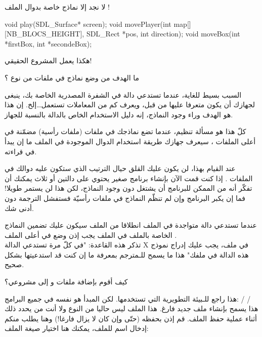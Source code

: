 لا نجد إلا نماذج خاصة بدوال الملف
!

\begin{Csource}
void play(SDL_Surface* screen);
void movePlayer(int map[][NB_BLOCS_HEIGHT], SDL_Rect *pos, int direction);
void moveBox(int *firstBox, int *secondeBox);
\end{Csource}

هكذا يعمل المشروع الحقيقي!

\begin{question}
  ما الهدف من وضع نماذج في ملفات من نوع
  ؟
\end{question}

السبب بسيط للغاية، عندما تستدعي دالة في الشفرة المصدرية الخاصة بك، ينبغى لجهازك أن يكون متعرفا عليها من قبل، ويعرف كم من المعاملات تستعمل\dots إلخ. إن هذا هو الهدف وراء وجود النماذج، إنه دليل الاستخدام الخاص بالدالة بالنسبة للجهاز.

كلّ هذا هو مسألة تنظيم، عندما تضع نماذجك في ملفات
(ملفات رأسية) مضمّنة في أعلى الملفات
،
سيعرف جهازك طريقة استخدام الدوال الموجودة في الملف ما إن يبدأ في قراءته.

عند القيام بهذا، لن يكون عليك القلق حيال الترتيب الذي ستكون عليه دوالك في الملفات
.
إذا كنت قمت الآن بإنشاء برنامج صغير يحتوي على دالتين أو ثلاث يمكنك أن تفكّر أنه من الممكن للبرنامج أن يشتغل دون وجود النماذج، لكن هذا لن يستمر طويلا! فما إن يكبر البرنامج وإن لم تنظّم النماذج في ملفات رأسيّة فستفشل الترجمة دون أدنى شك.

\begin{information}
  عندما تستدعي دالة متواجدة في الملف
  انطلاقا من الملف
  سيكون عليك تضمين النماذج الخاصة بالملف
  في الملف
  يجب إذن وضع
  في أعلى الملف
  .\\
  تذكر هذه القاعدة: "في كلّ مرة تستدعي الدالة
  \textenglish{X}
  في ملف، يجب عليك إدراج نموذج هذه الدالة في ملفك" هذا ما يسمح للـمترجم بمعرفة ما إن كنت قد استدعيتها بشكل صحيح.
\end{information}

\begin{question}
  كيف أقوم بإضافة ملفات
 و
 إلى مشروعي؟
\end{question}

هذا راجع للـبيئة التطويرية التي تستخدمها. لكن المبدأ هو نفسه في جميع البرامج:
 /  / \\
هذا يسمح بإنشاء ملف جديد فارغ. هذا الملف ليس حاليا من النوع
ولا
أنت من يحدد ذلك أثناء عملية حفظ الملف. قم إذن بحفظه (حتّى وإن كان لا يزال فارغا!) وهنا يطلب منكم إدخال اسم للملف، يمكنك هنا اختيار صيغة الملف:

